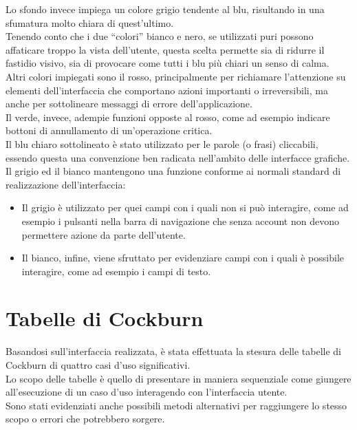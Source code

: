     Lo sfondo invece impiega un colore grigio tendente al blu, risultando in una sfumatura molto chiara di quest’ultimo. \\
    Tenendo conto che i due “colori” bianco e nero, se utilizzati puri possono affaticare troppo la vista dell’utente, questa scelta permette sia di ridurre il fastidio visivo, sia di provocare come tutti i blu più chiari un senso di calma. \\
    Altri colori impiegati sono il rosso, principalmente per richiamare l’attenzione su elementi dell’interfaccia che comportano azioni importanti o irreversibili, ma anche per sottolineare messaggi di errore dell’applicazione. \\
    Il verde, invece, adempie funzioni opposte al rosso, come ad esempio indicare bottoni di annullamento di un’operazione critica. \\
    Il blu chiaro sottolineato è stato utilizzato per le parole (o frasi) cliccabili, essendo questa una convenzione ben radicata nell’ambito delle interfacce grafiche. \\
    Il grigio ed il bianco mantengono una funzione conforme ai normali standard di realizzazione dell’interfaccia:
    \begin{itemize}
        \item Il grigio è utilizzato per quei campi con i quali non si può interagire, come ad esempio i pulsanti nella barra di navigazione che senza account non devono permettere azione da parte dell’utente.
        \item Il bianco, infine, viene sfruttato per evidenziare campi con i quali è possibile interagire, come ad esempio i campi di testo.
    \end{itemize}      
    
    \newpage
    
    \section{Tabelle di Cockburn}
    Basandosi sull'interfaccia realizzata, è stata effettuata la stesura delle tabelle di Cockburn di quattro casi d'uso significativi. \\
    Lo scopo delle tabelle è quello di presentare in maniera sequenziale come giungere all'esecuzione di un caso d'uso interagendo con l'interfaccia utente. \\
    Sono stati evidenziati anche possibili metodi alternativi per raggiungere lo stesso scopo o errori che potrebbero sorgere.
    
